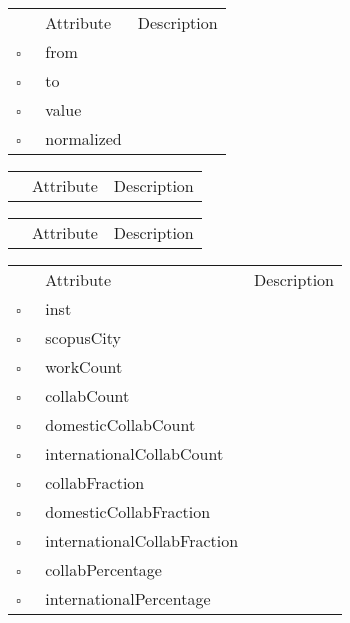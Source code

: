 \begin{table}
\caption{ReferenceFlow  }

\begin{longtable}{llp{8cm}}
& Attribute & Description \\
$\square$\ & from &  \\
$\square$\ & to &  \\
$\square$\ & value &  \\
$\square$\ & normalized &  \\
\end{longtable}
\label{attr:ReferenceFlow}
\end{table}

\begin{table}
\caption{Scenario  This class describes the dataset for the application. Typically there is a single instance of this class in the application at all times.}

\begin{longtable}{llp{8cm}}
& Attribute & Description \\
\end{longtable}
\label{attr:Scenario}
\end{table}

\begin{table}
\caption{School  }

\begin{longtable}{llp{8cm}}
& Attribute & Description \\
\end{longtable}
\label{attr:School}
\end{table}

\clearpage
\begin{table}
\caption{ScopusAffiliation  }

\begin{longtable}{llp{8cm}}
& Attribute & Description \\
$\square$\ & inst &  \\
$\square$\ & scopusCity &  \\
$\square$\ & workCount &  \\
$\square$\ & collabCount &  \\
$\square$\ & domesticCollabCount &  \\
$\square$\ & internationalCollabCount &  \\
$\square$\ & collabFraction &  \\
$\square$\ & domesticCollabFraction &  \\
$\square$\ & internationalCollabFraction &  \\
$\square$\ & collabPercentage &  \\
$\square$\ & internationalPercentage &  \\
\end{longtable}
\label{attr:ScopusAffiliation}
\end{table}

